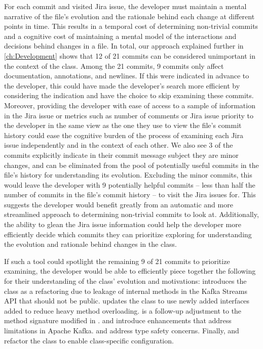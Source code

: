 For each commit and visited Jira issue, the developer must maintain a mental narrative of the file's evolution and the rationale behind each change at different points in time. 
This results in a temporal cost of determining non-trivial commits and a cognitive cost of maintaining a mental model of the interactions and decisions behind changes in a file. 
In total, our approach explained further in \autoref{ch:Development} shows that 12 of 21 commits can be considered unimportant in the context of the  class. 
Among the 21 commits, 9 commits only affect documentation, annotations, and newlines.
If this were indicated in advance to the developer, this could have made the developer's search more efficient by considering the indication and have the choice to skip examining these commits.
Moreover, providing the developer with ease of access to a sample of information in the Jira issue or metrics such as number of comments or Jira issue priority to the developer in the same view as the one they use to view the file's commit history could ease the cognitive burden of the process of examining each Jira issue independently and in the context of each other.
We also see 3 of the commits explicitly indicate in their commit message subject they are minor changes, and can be eliminated from the pool of potentially useful commits in the file's history for understanding its evolution.
Excluding the minor commits, this would leave the developer with 9 potentially helpful commits -- less than half the number of commits in the file's commit history -- to visit the Jira issues for.
This suggests the developer would benefit greatly from an automatic and more streamlined approach to determining non-trivial commits to look at.
Additionally, the ability to glean the Jira issue information could help the developer more efficiently decide which commits they can prioritize exploring for understanding the evolution and rationale behind changes in the  class.

If such a tool could spotlight the remaining 9 of 21 commits to prioritize examining, the developer would be able to efficiently piece together the following for their understanding of the  class' evolution and motivations: 
 introduces the  class as a refactoring due to leakage of internal methods in the Kafka Streams API that should not be public.
 updates the  class to use newly added interfaces added to reduce heavy method overloading.
 is a follow-up adjustment to the method signature modified in .
 and  introduce enhancements that address limitations in Apache Kafka.
 and  address type safety concerns.
Finally,  and  refactor the  class to enable class-specific configuration.


